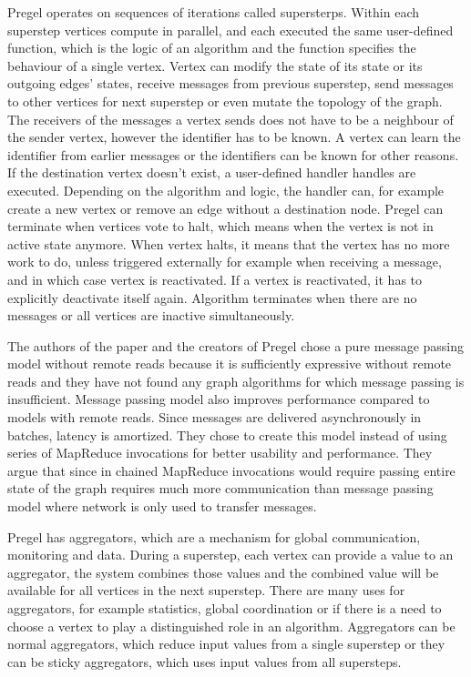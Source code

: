 \documentclass{article}
\theoremstyle{definition}
\begin{document}
Pregel operates on sequences of iterations called supersterps. Within each superstep vertices compute in parallel, and each executed the same user-defined function, which is the logic of an algorithm and the function specifies the behaviour of a single vertex. Vertex can modify the state of its state or its outgoing edges' states, receive messages from previous superstep, send messages to other vertices for next superstep or even mutate the topology of the graph. The receivers of the messages a vertex sends does not have to be a neighbour of the sender vertex, however the identifier has to be known. A vertex can learn the identifier from earlier messages or the identifiers can be known for other reasons. If the destination vertex doesn't exist, a user-defined handler handles are executed. Depending on the algorithm and logic, the handler can, for example create a new vertex or remove an edge without a destination node. Pregel can terminate when vertices vote to halt, which means when the vertex is not in active state anymore. When vertex halts, it means that the vertex has no more work to do, unless triggered externally for example when receiving a message, and in which case vertex is reactivated. If a vertex is reactivated, it has to explicitly deactivate itself again. Algorithm terminates when there are no messages or all vertices are inactive simultaneously. 

The authors of the paper and the creators of Pregel chose a pure message passing model without remote reads because it is sufficiently expressive without remote reads and they have not found any graph algorithms for which message passing is insufficient. Message passing model also improves performance compared to models with remote reads. Since messages are delivered asynchronously in batches, latency is amortized. They chose to create this model instead of using series of MapReduce invocations for better usability and performance. They argue that since in chained MapReduce invocations would require passing entire state of the graph requires much more communication than message passing model where network is only used to transfer messages. 

Pregel has aggregators, which are a mechanism for global communication, monitoring and data. During a superstep, each vertex can provide a value to an aggregator, the system combines those values and the combined value will be available for all vertices in the next superstep. There are many uses for aggregators, for example statistics, global coordination or if there is a need to choose a vertex to play a distinguished role in an algorithm. Aggregators can be normal aggregators, which reduce input values from a single superstep or they can be sticky aggregators, which uses input values from all supersteps. 
\end{document}
